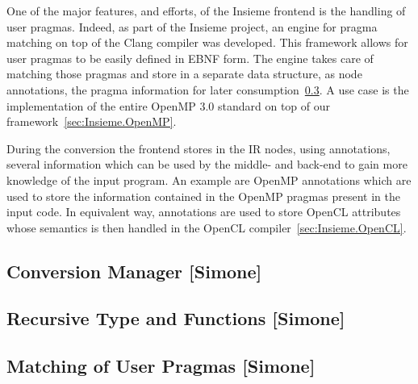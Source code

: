 One of the major features, and efforts, of the Insieme frontend is the handling
of user pragmas. Indeed, as part of the Insieme project, an engine for pragma
matching on top of the Clang compiler was developed. This framework allows for
user pragmas to be easily defined in EBNF form. The engine takes care of
matching those pragmas and store in a separate data structure, as node
annotations, the pragma information for later
consumption~\ref{sec:Insieme.Pragmas}. A use case is the implementation of the
entire OpenMP 3.0 standard on top of our framework~\ref{sec:Insieme.OpenMP}.

During the conversion the frontend stores in the IR nodes, using annotations,
several information which can be used by the middle- and back-end to gain more
knowledge of the input program. An example are OpenMP annotations which are used
to store the information contained in the OpenMP pragmas present in the input
code. In equivalent way, annotations are used to store OpenCL attributes whose
semantics is then handled in the OpenCL compiler~\ref{sec:Insieme.OpenCL}.





\subsection{Conversion Manager [Simone]}
\label{sec:Insieme.Frontend.Convert}

\subsection{Recursive Type and Functions [Simone]}
\label{sec:Insieme.Frontend.Recursion}

\subsection{Matching of User Pragmas [Simone]}
\label{sec:Insieme.Pragmas}





